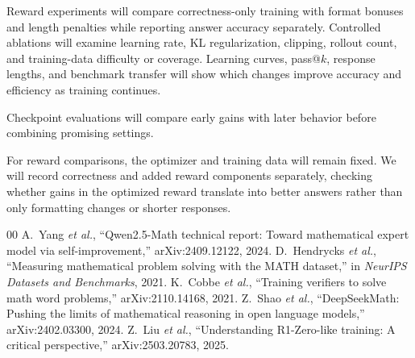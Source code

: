 \documentclass[conference]{IEEEtran}
\begin{document}
Reward experiments will compare correctness-only training with format bonuses and length penalties while reporting answer accuracy separately. Controlled ablations will examine learning rate, KL regularization, clipping, rollout count, and training-data difficulty or coverage. Learning curves, pass@$k$, response lengths, and benchmark transfer will show which changes improve accuracy and efficiency as training continues.

Checkpoint evaluations will compare early gains with later behavior before combining promising settings.

For reward comparisons, the optimizer and training data will remain fixed. We will record correctness and added reward components separately, checking whether gains in the optimized reward translate into better answers rather than only formatting changes or shorter responses.

\begin{thebibliography}{00}
 A.~Yang \emph{et al.}, ``Qwen2.5-Math technical report: Toward mathematical expert model via self-improvement,'' arXiv:2409.12122, 2024.
 D.~Hendrycks \emph{et al.}, ``Measuring mathematical problem solving with the MATH dataset,'' in \emph{NeurIPS Datasets and Benchmarks}, 2021.
 K.~Cobbe \emph{et al.}, ``Training verifiers to solve math word problems,'' arXiv:2110.14168, 2021.
 Z.~Shao \emph{et al.}, ``DeepSeekMath: Pushing the limits of mathematical reasoning in open language models,'' arXiv:2402.03300, 2024.
 Z.~Liu \emph{et al.}, ``Understanding R1-Zero-like training: A critical perspective,'' arXiv:2503.20783, 2025.
\end{thebibliography}
\end{document}
